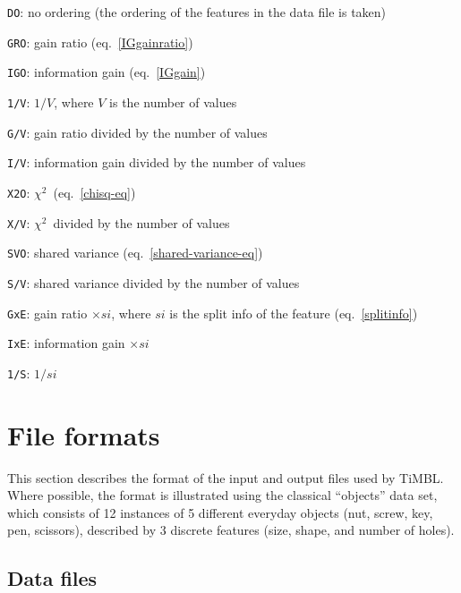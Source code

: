 \documentclass{report}
\newcommand{\chisq}{{$ \chi^2 $}}
\begin{document}
\begin{description}
	\begin{description}
         \item {\tt DO}: no ordering (the ordering of the features in
           the data file is taken)
         \item {\tt GRO}: gain ratio (eq.~\ref{IGgainratio})
         \item {\tt IGO}: information gain (eq.~\ref{IGgain})
         \item {\tt 1/V}: $1/V$, where $V$ is the number of values
         \item {\tt G/V}: gain ratio divided by the number of values
         \item {\tt I/V}: information gain divided by the number of
           values
         \item {\tt X2O}: \chisq \ (eq.~\ref{chisq-eq})
         \item {\tt X/V}: \chisq \ divided by the number of values
         \item {\tt SVO}: shared variance
           (eq.~\ref{shared-variance-eq})
         \item {\tt S/V}: shared variance divided by the number of
           values
         \item {\tt GxE}: gain ratio $\times si$, where $si$ is the
           split info of the feature (eq.~\ref{splitinfo})
         \item {\tt IxE}: information gain $\times si$
         \item {\tt 1/S}: $1/si$
	\end{description}

\end{description}

\section{File formats}
\label{fileformats}

This section describes the format of the input and output files used
by TiMBL. Where possible, the format is illustrated using the
classical ``objects'' data set, which consists of 12 instances of 5
different everyday objects (nut, screw, key, pen, scissors), described
by 3 discrete features (size, shape, and number of holes).

\subsection{Data files}
\label{dataformats}
\end{document}
